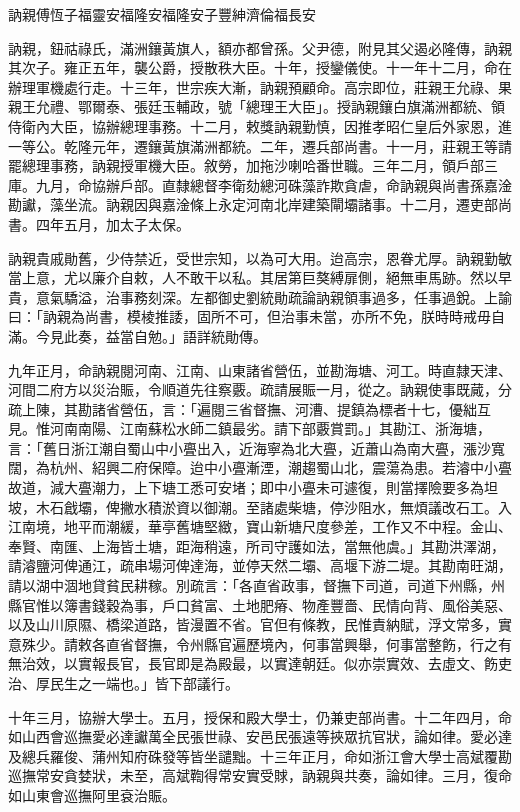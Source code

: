 
\begin{pinyinscope}
訥親傅恆子福靈安福隆安福隆安子豐紳濟倫福長安

訥親，鈕祜祿氏，滿洲鑲黃旗人，額亦都曾孫。父尹德，附見其父遏必隆傳，訥親其次子。雍正五年，襲公爵，授散秩大臣。十年，授鑾儀使。十一年十二月，命在辦理軍機處行走。十三年，世宗疾大漸，訥親預顧命。高宗即位，莊親王允祿、果親王允禮、鄂爾泰、張廷玉輔政，號「總理王大臣」。授訥親鑲白旗滿洲都統、領侍衛內大臣，協辦總理事務。十二月，敕獎訥親勤慎，因推孝昭仁皇后外家恩，進一等公。乾隆元年，遷鑲黃旗滿洲都統。二年，遷兵部尚書。十一月，莊親王等請罷總理事務，訥親授軍機大臣。敘勞，加拖沙喇哈番世職。三年二月，領戶部三庫。九月，命協辦戶部。直隸總督李衛劾總河硃藻詐欺貪虐，命訥親與尚書孫嘉淦勘讞，藻坐流。訥親因與嘉淦條上永定河南北岸建築閘壩諸事。十二月，遷吏部尚書。四年五月，加太子太保。

訥親貴戚勛舊，少侍禁近，受世宗知，以為可大用。迨高宗，恩眷尤厚。訥親勤敏當上意，尤以廉介自敕，人不敢干以私。其居第巨獒縛扉側，絕無車馬跡。然以早貴，意氣驕溢，治事務刻深。左都御史劉統勛疏論訥親領事過多，任事過銳。上諭曰：「訥親為尚書，模棱推諉，固所不可，但治事未當，亦所不免，朕時時戒毋自滿。今見此奏，益當自勉。」語詳統勛傳。

九年正月，命訥親閱河南、江南、山東諸省營伍，並勘海塘、河工。時直隸天津、河間二府方以災治賑，令順道先往察覈。疏請展賑一月，從之。訥親使事既蕆，分疏上陳，其勘諸省營伍，言：「遍閱三省督撫、河漕、提鎮為標者十七，優絀互見。惟河南南陽、江南蘇松水師二鎮最劣。請下部覈賞罰。」其勘江、浙海塘，言：「舊日浙江潮自蜀山中小亹出入，近海寧為北大亹，近蕭山為南大亹，漲沙寬闊，為杭州、紹興二府保障。迨中小亹漸湮，潮趨蜀山北，震蕩為患。若濬中小亹故道，減大亹潮力，上下塘工悉可安堵；即中小亹未可遽復，則當擇險要多為坦坡，木石戧壩，俾撇水積淤資以御潮。至諸處柴塘，停沙阻水，無煩議改石工。入江南境，地平而潮緩，華亭舊塘堅緻，寶山新塘尺度參差，工作又不中程。金山、奉賢、南匯、上海皆土塘，距海稍遠，所司守護如法，當無他虞。」其勘洪澤湖，請濬鹽河俾通江，疏串場河俾達海，並停天然二壩、高堰下游二堤。其勘南旺湖，請以湖中涸地貸貧民耕稼。別疏言：「各直省政事，督撫下司道，司道下州縣，州縣官惟以簿書錢穀為事，戶口貧富、土地肥瘠、物產豐嗇、民情向背、風俗美惡、以及山川原隰、橋梁道路，皆漫置不省。官但有條教，民惟責納賦，浮文常多，實意殊少。請敕各直省督撫，令州縣官遍歷境內，何事當興舉，何事當整飭，行之有無治效，以實報長官，長官即是為殿最，以實達朝廷。似亦崇實效、去虛文、飭吏治、厚民生之一端也。」皆下部議行。

十年三月，協辦大學士。五月，授保和殿大學士，仍兼吏部尚書。十二年四月，命如山西會巡撫愛必達讞萬全民張世祿、安邑民張遠等挾眾抗官狀，論如律。愛必達及總兵羅俊、蒲州知府硃發等皆坐譴黜。十三年正月，命如浙江會大學士高斌覆勘巡撫常安貪婪狀，未至，高斌鞫得常安實受賕，訥親與共奏，論如律。三月，復命如山東會巡撫阿里袞治賑。


\end{pinyinscope}
